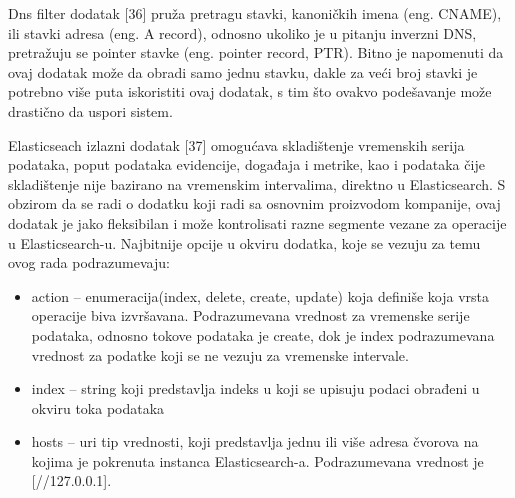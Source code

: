 \par
Dns filter dodatak [36] pruža pretragu stavki, kanoničkih imena (eng. CNAME), ili stavki adresa (eng. A record), odnosno ukoliko je u pitanju inverzni DNS, pretražuju se pointer stavke (eng. pointer record, PTR). Bitno je napomenuti da ovaj dodatak može da obradi samo jednu stavku, dakle za veći broj stavki je potrebno više puta iskoristiti ovaj dodatak, s tim što ovakvo podešavanje može drastično da uspori sistem. 

\par
Elasticseach izlazni dodatak [37] omogućava skladištenje vremenskih serija podataka, poput podataka evidencije, događaja i metrike, kao i podataka čije skladištenje nije bazirano na vremenskim intervalima, direktno u Elasticsearch. S obzirom da se radi o dodatku koji radi sa osnovnim proizvodom kompanije, ovaj dodatak je jako fleksibilan i može kontrolisati razne segmente vezane za operacije u Elasticsearch-u. Najbitnije opcije u okviru dodatka, koje se vezuju za temu ovog rada podrazumevaju:
\begin{itemize}
    \item action – enumeracija(index, delete, create, update) koja definiše koja vrsta operacije biva izvršavana. Podrazumevana vrednost za vremenske serije podataka, odnosno tokove podataka je create, dok je index podrazumevana vrednost za podatke koji se ne vezuju za vremenske intervale.
    \item index – string koji predstavlja indeks u koji se upisuju podaci obrađeni u okviru toka podataka
    \item hosts – uri tip vrednosti, koji predstavlja jednu ili više adresa čvorova na kojima je pokrenuta instanca Elasticsearch-a. Podrazumevana vrednost je [//127.0.0.1].
\end{itemize}
